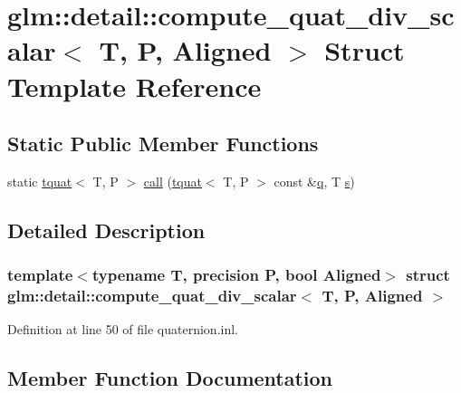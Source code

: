 \hypertarget{structglm_1_1detail_1_1compute__quat__div__scalar}{}\section{glm\+::detail\+::compute\+\_\+quat\+\_\+div\+\_\+scalar$<$ T, P, Aligned $>$ Struct Template Reference}
\label{structglm_1_1detail_1_1compute__quat__div__scalar}
\subsection*{Static Public Member Functions}
\begin{DoxyCompactItemize}
\item 
static \mbox{\hyperlink{structglm_1_1tquat}{tquat}}$<$ T, P $>$ \mbox{\hyperlink{structglm_1_1detail_1_1compute__quat__div__scalar_a7d45d4dd6252d1d5d43d396a0d1bc51a}{call}} (\mbox{\hyperlink{structglm_1_1tquat}{tquat}}$<$ T, P $>$ const \&\mbox{\hyperlink{glad_8h_a514729309336df22bcc8eda979d6ced4}{q}}, T \mbox{\hyperlink{glad_8h_af1b1d5edfea6a34daee7389b1b5810ad}{s}})
\end{DoxyCompactItemize}


\subsection{Detailed Description}
\subsubsection*{template$<$typename T, precision P, bool Aligned$>$\newline
struct glm\+::detail\+::compute\+\_\+quat\+\_\+div\+\_\+scalar$<$ T, P, Aligned $>$}



Definition at line 50 of file quaternion.\+inl.



\subsection{Member Function Documentation}
\mbox{\label{structglm_1_1detail_1_1compute__quat__div__scalar_a7d45d4dd6252d1d5d43d396a0d1bc51a}} 

